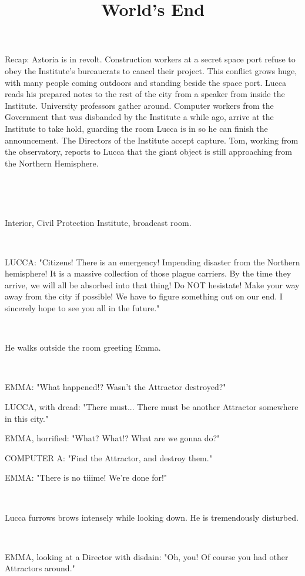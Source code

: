 \documentclass[11pt]{article}
\begin{document}
\ttfamily
\title{World's End}
\maketitle


Recap: Aztoria is in revolt. 
Construction workers at a secret space port refuse to obey the Institute's bureaucrats to cancel their project.
This conflict grows huge, with many people coming outdoors and standing beside the space port.
Lucca reads his prepared notes to the rest of the city from a speaker from inside the Institute.
University professors gather around.
Computer workers from the Government that was disbanded by the Institute a while ago, arrive at the Institute to take hold, guarding the room Lucca is in so he can finish the announcement.
The Directors of the Institute accept capture.
Tom, working from the observatory, reports to Lucca that the giant object is still approaching from the Northern Hemisphere. 

\ 

\ 

Interior, Civil Protection Institute, broadcast room. 

\ 

LUCCA: "Citizens! There is an emergency! 
Impending disaster from the Northern hemisphere!
It is a massive collection of those plague carriers.
By the time they arrive, we will all be absorbed into that thing!
Do NOT hesistate!
Make your way away from the city if possible!
We have to figure something out on our end.
I sincerely hope to see you all in the future."

\ 

He walks outside the room greeting Emma. 

\ 

EMMA: "What happened!?
Wasn't the Attractor destroyed?"

LUCCA, with dread: "There must...
There must be another Attractor somewhere in this city."

EMMA, horrified: "What? What!? What are we gonna do?"

COMPUTER A: "Find the Attractor, and destroy them."

EMMA: "There is no tiiime! We're done for!"

\ 

Lucca furrows brows intensely while looking down. 
He is tremendously disturbed.

\ 

EMMA, looking at a Director with disdain: "Oh, you! 
Of course you had other Attractors around."
\end{document}
